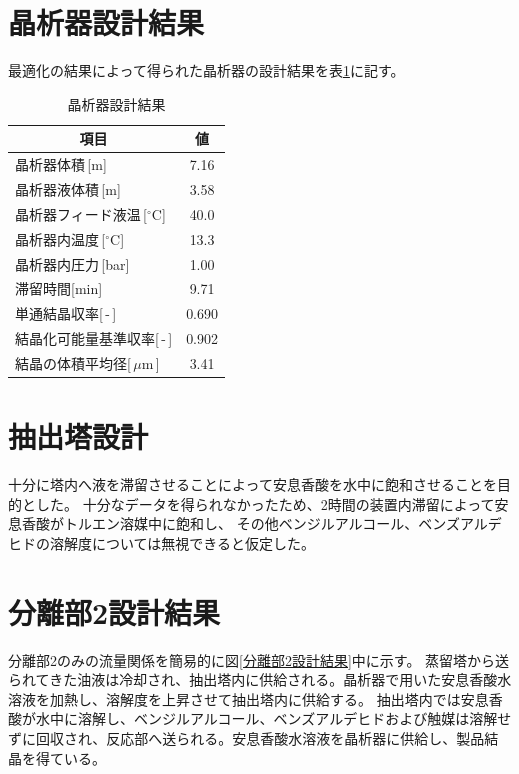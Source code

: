 \documentclass[a4j]{jsreport}
\begin{document}
\section{晶析器設計結果}
最適化の結果によって得られた晶析器の設計結果を表\ref{晶析器設計結果}に記す。
\begin{table}[h]
    \caption{晶析器設計結果}
    \label{晶析器設計結果}
    \begin{center}
        \begin{tabular}{lc}\hline
            \multicolumn{1}{c}{項目}       &  値    \\   \hline
            晶析器体積\,[m]                 &7.16    \\
            晶析器液体積\,[m]                &3.58    \\
            晶析器フィード液温\,[$^\circ$C]   &40.0    \\
            晶析器内温度\,[$^\circ$C]         &13.3   \\
            晶析器内圧力\,[bar]               &1.00    \\
            滞留時間[min]                    &9.71    \\
            単通結晶収率[\,-\,]               &0.690   \\
            結晶化可能量基準収率[\,-\,]        &0.902    \\ 
            結晶の体積平均径[\,$\mu$m\,]      &3.41     \\ \hline
        \end{tabular}
    \end{center}
\end{table}

\section{抽出塔設計}
十分に塔内へ液を滞留させることによって安息香酸を水中に飽和させることを目的とした。
十分なデータを得られなかったため、2時間の装置内滞留によって安息香酸がトルエン溶媒中に飽和し、
その他ベンジルアルコール、ベンズアルデヒドの溶解度については無視できると仮定した。

\section{分離部2設計結果}
分離部2のみの流量関係を簡易的に図\ref{分離部2設計結果}中に示す。
蒸留塔から送られてきた油液は冷却され、抽出塔内に供給される。晶析器で用いた安息香酸水溶液を加熱し、溶解度を上昇させて抽出塔内に供給する。
抽出塔内では安息香酸が水中に溶解し、ベンジルアルコール、ベンズアルデヒドおよび触媒は溶解せずに回収され、反応部へ送られる。安息香酸水溶液を晶析器に供給し、製品結晶を得ている。
\end{document}
